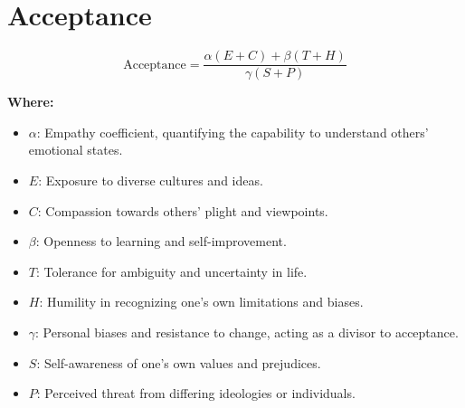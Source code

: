 \chapter{Acceptance}

\begin{equation}
\text{Acceptance} = \frac{\alpha(E + C) + \beta(T + H)}{\gamma (S + P)}
\end{equation}

\textbf{Where:}

\begin{itemize}
    \item $\alpha$: Empathy coefficient, quantifying the capability to understand others' emotional states.
    \item $E$: Exposure to diverse cultures and ideas.
    \item $C$: Compassion towards others' plight and viewpoints.
    \item $\beta$: Openness to learning and self-improvement.
    \item $T$: Tolerance for ambiguity and uncertainty in life.
    \item $H$: Humility in recognizing one's own limitations and biases.
    \item $\gamma$: Personal biases and resistance to change, acting as a divisor to acceptance.
    \item $S$: Self-awareness of one's own values and prejudices.
    \item $P$: Perceived threat from differing ideologies or individuals.
\end{itemize}